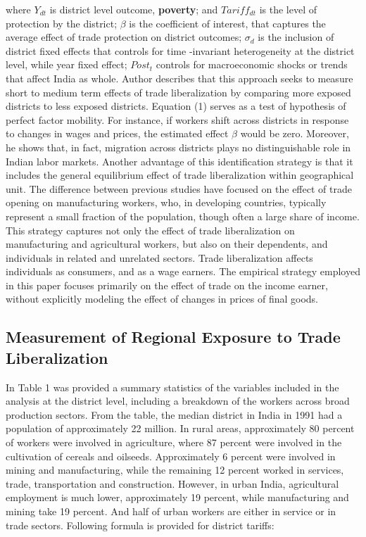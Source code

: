 \documentclass[a4paper,12pt]{article}
\begin{document}
where $Y_{dt}$ is district level outcome, \textbf{poverty}; and $Tariff_{dt}$ is the level of protection by the district; $\beta$ is the coefficient of interest, that captures the average effect of trade protection on district outcomes; $\sigma_d$ is the inclusion of district fixed effects that controls for time -invariant heterogeneity at the district level, while year fixed effect; $Post_t$ controls for macroeconomic shocks or trends that affect India as whole. Author describes that this approach seeks to measure short to medium term effects of trade liberalization by comparing more exposed districts to less exposed districts. Equation (1) serves as a test of hypothesis of perfect factor mobility. For instance, if workers shift across districts in response to changes in wages and prices, the estimated effect $\beta$ would be zero. Moreover, he shows that, in fact, migration across districts plays no distinguishable role in Indian labor markets. Another advantage of this identification strategy is that it includes the general equilibrium effect of trade liberalization within geographical unit. The difference between previous studies have focused on the effect of trade opening on manufacturing workers, who, in developing countries, typically represent a small fraction of the population, though often a large share of income. This strategy captures not only the effect of trade liberalization on manufacturing and agricultural workers, but also on their dependents, and individuals in related and unrelated sectors. Trade liberalization affects individuals as consumers, and as a wage earners. \cite{Guido06} The empirical strategy employed in this paper focuses primarily on the effect of trade on the income earner, without explicitly modeling the effect of changes in prices of final goods.


\subsection{Measurement of Regional Exposure to Trade Liberalization}

In Table 1 was provided a summary statistics of the variables included in the analysis at the district level, including a breakdown of the workers across broad production sectors. From the table, the median district in India in 1991 had a population of approximately 22 million. In rural areas, approximately 80 percent of workers were involved in agriculture, where 87 percent were involved in the cultivation of cereals and oilseeds. Approximately 6 percent were involved in mining and manufacturing, while the remaining 12 percent worked in services, trade, transportation and construction. However, in urban India, agricultural employment is much lower, approximately 19 percent, while manufacturing and mining take 19 percent. And half of urban workers are either in service or in trade sectors. Following formula is provided for district tariffs: 
\end{document}
